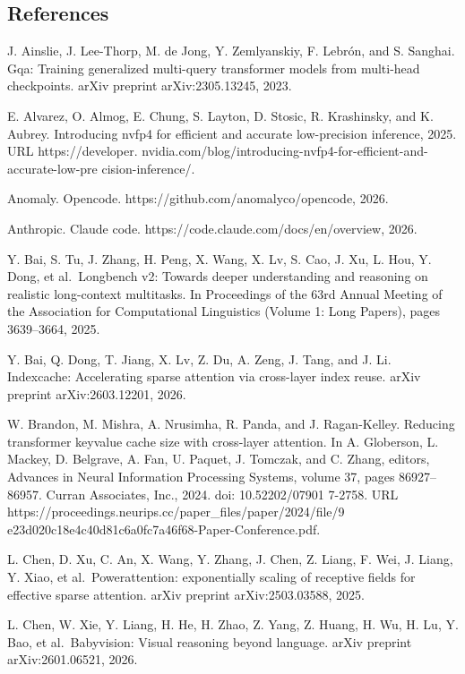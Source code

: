 \subsection{References}\label{references}

J. Ainslie, J. Lee-Thorp, M. de Jong, Y. Zemlyanskiy, F. Lebrón, and S.
Sanghai. Gqa: Training generalized multi-query transformer models from
multi-head checkpoints. arXiv preprint arXiv:2305.13245, 2023.

E. Alvarez, O. Almog, E. Chung, S. Layton, D. Stosic, R. Krashinsky, and
K. Aubrey. Introducing nvfp4 for efficient and accurate low-precision
inference, 2025. URL https://developer.
nvidia.com/blog/introducing-nvfp4-for-efficient-and-accurate-low-pre
cision-inference/.

Anomaly. Opencode. https://github.com/anomalyco/opencode, 2026.

Anthropic. Claude code. https://code.claude.com/docs/en/overview, 2026.

Y. Bai, S. Tu, J. Zhang, H. Peng, X. Wang, X. Lv, S. Cao, J. Xu, L. Hou,
Y. Dong, et al.~Longbench v2: Towards deeper understanding and reasoning
on realistic long-context multitasks. In Proceedings of the 63rd Annual
Meeting of the Association for Computational Linguistics (Volume 1: Long
Papers), pages 3639--3664, 2025.

Y. Bai, Q. Dong, T. Jiang, X. Lv, Z. Du, A. Zeng, J. Tang, and J. Li.
Indexcache: Accelerating sparse attention via cross-layer index reuse.
arXiv preprint arXiv:2603.12201, 2026.

W. Brandon, M. Mishra, A. Nrusimha, R. Panda, and J. Ragan-Kelley.
Reducing transformer keyvalue cache size with cross-layer attention. In
A. Globerson, L. Mackey, D. Belgrave, A. Fan, U. Paquet, J. Tomczak, and
C. Zhang, editors, Advances in Neural Information Processing Systems,
volume 37, pages 86927--86957. Curran Associates, Inc., 2024. doi:
10.52202/07901 7-2758. URL
https://proceedings.neurips.cc/paper\_files/paper/2024/file/9
e23d020c18e4c40d81c6a0fc7a46f68-Paper-Conference.pdf.

L. Chen, D. Xu, C. An, X. Wang, Y. Zhang, J. Chen, Z. Liang, F. Wei, J.
Liang, Y. Xiao, et al.~Powerattention: exponentially scaling of
receptive fields for effective sparse attention. arXiv preprint
arXiv:2503.03588, 2025.

L. Chen, W. Xie, Y. Liang, H. He, H. Zhao, Z. Yang, Z. Huang, H. Wu, H.
Lu, Y. Bao, et al.~Babyvision: Visual reasoning beyond language. arXiv
preprint arXiv:2601.06521, 2026.

